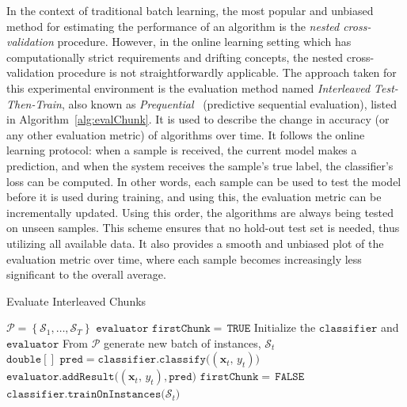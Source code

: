 \documentclass[reqno]{vcuthesis}
\newcommand{\set}[1]{{\left\{#1\right\}}}
\newcommand{\proc}{{\mathcal P}}
\numberwithin{equation}{chapter}
\begin{document}
In the context of traditional batch learning, the most popular and unbiased method for estimating the performance of an algorithm is the \textit{nested cross-validation} procedure. However, in the online learning setting which has computationally strict requirements and drifting concepts, the nested cross-validation procedure is not straightforwardly applicable. The approach taken for this experimental environment is the evaluation method named \textit{Interleaved Test-Then-Train}, also known as \textit{Prequential}~\cite{gama2013evaluating} (predictive sequential evaluation), listed in Algorithm~\ref{alg:evalChunk}. It is used to describe the change in accuracy (or any other evaluation metric) of algorithms over time. It follows the online learning protocol: when a sample is received, the current model makes a prediction, and when the system receives the sample's true label, the classifier's loss can be computed. In other words, each sample can be used to test the model before it is used during training, and using this, the evaluation metric can be incrementally updated. Using this order, the algorithms are always being tested on unseen samples. This scheme ensures that no hold-out test set is needed, thus utilizing all available data. It also provides a smooth and unbiased plot of the evaluation metric over time, where each sample becomes increasingly less significant to the overall average. 
\begin{algorithm}[t!]
\centering \small
\caption{Evaluate Interleaved Chunks}
\label{alg:evalChunk} 
\begin{algorithmic}[1]
\renewcommand{\algorithmicrequire}{\textbf{Input:}}
\renewcommand{\algorithmicensure}{\textbf{Output:}}
\Require $\proc = \set{\mathcal{S}_1,\ldots,\mathcal{S}_T}$
\Ensure  $\mathtt{evaluator}$
\State $\mathtt{firstChunk =\,TRUE}$
\State Initialize the $\mathtt{classifier}$ and $\mathtt{evaluator}$
\While{$\proc \neq \emptyset$}
\State From $\proc$ generate new batch of instances, $\mathcal{S}_t$
\State $\mathtt{double[]\,\,pred = classifier.classify(}(\bm x_t,\, y_t)\mathtt{)}$ 
\State $\mathtt{evaluator.addResult(}(\bm x_t,\, y_t)\mathtt{, pred)}$
\EndFor
\Else 
\State $\mathtt{firstChunk =\,FALSE}$
\EndIf
\State $\mathtt{classifier.trainOnInstances(}\mathcal{S}_t\mathtt{)}$
\EndWhile
\end{algorithmic} 
\end{algorithm}
\end{document}
